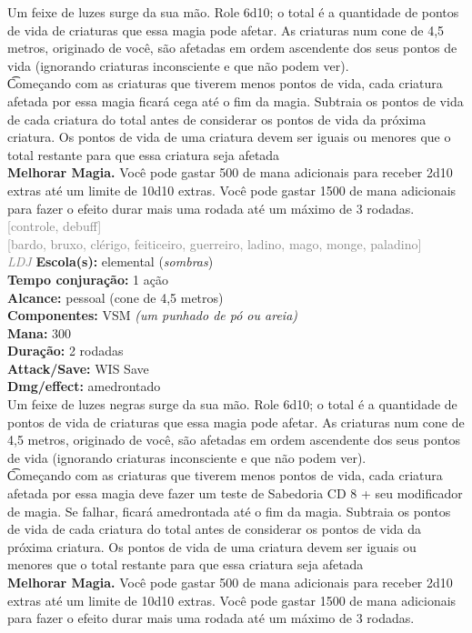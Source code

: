 \documentclass{RPG_Adventure}[2021/10/20]
\begin{document}
{\normalsize Um feixe de luzes surge da sua mão. Role 6d10; o total é a quantidade de pontos de vida de criaturas que essa magia pode afetar. As criaturas num cone de 4,5 metros, originado de você, são afetadas em ordem ascendente dos seus pontos de vida (ignorando criaturas inconsciente e que não podem ver).\\\t Começando com as criaturas que tiverem menos pontos de vida, cada criatura afetada por essa magia ficará cega até o fim da magia. Subtraia os pontos de vida de cada criatura do total antes de considerar os pontos de vida da próxima criatura. Os pontos de vida de uma criatura devem ser iguais ou menores que o total restante para que essa criatura seja afetada\\\t \textbf{Melhorar Magia.} Você pode gastar 500 de mana adicionais para receber 2d10 extras até um limite de 10d10 extras. Você pode gastar 1500 de mana adicionais para fazer o efeito durar mais uma rodada até um máximo de 3 rodadas.\\}
{\scriptsize \textcolor{gray}{[controle, debuff]\\}}
{\scriptsize \textcolor{gray}{[bardo, bruxo, clérigo, feiticeiro, guerreiro, ladino, mago, monge, paladino]\\}}
{\tiny \textcolor{gray}{\textit{LDJ}}}
{\small \t \textbf{Escola(s):} elemental (\textit{sombras})\\\t \textbf{Tempo conjuração:} 1 ação\\\t \textbf{Alcance:} pessoal (cone de 4,5 metros)\\\t \textbf{Componentes:} VSM \textit{(um punhado de pó ou areia)}\\\t \textbf{Mana:} 300\\\t \textbf{Duração:} 2 rodadas\\\t \textbf{Attack/Save:} WIS Save\\\t \textbf{Dmg/effect:} amedrontado\\}
{\normalsize Um feixe de luzes negras surge da sua mão. Role 6d10; o total é a quantidade de pontos de vida de criaturas que essa magia pode afetar. As criaturas num cone de 4,5 metros, originado de você, são afetadas em ordem ascendente dos seus pontos de vida (ignorando criaturas inconsciente e que não podem ver).\\\t Começando com as criaturas que tiverem menos pontos de vida, cada criatura afetada por essa magia deve fazer um teste de Sabedoria CD 8 + seu modificador de magia. Se falhar, ficará amedrontada até o fim da magia. Subtraia os pontos de vida de cada criatura do total antes de considerar os pontos de vida da próxima criatura. Os pontos de vida de uma criatura devem ser iguais ou menores que o total restante para que essa criatura seja afetada\\\t \textbf{Melhorar Magia.} Você pode gastar 500 de mana adicionais para receber 2d10 extras até um limite de 10d10 extras. Você pode gastar 1500 de mana adicionais para fazer o efeito durar mais uma rodada até um máximo de 3 rodadas.\\}
\end{document}
